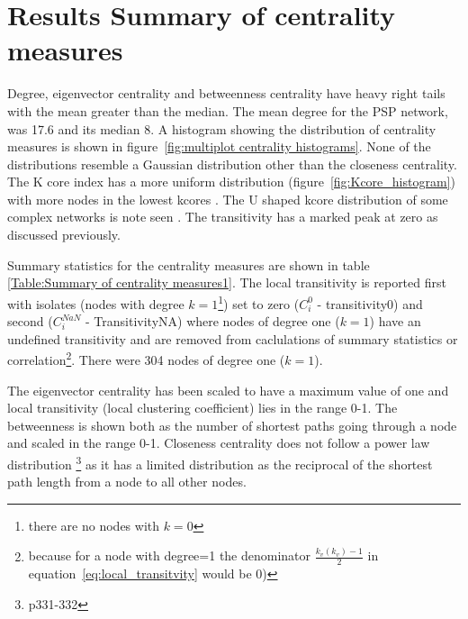 




\clearpage

\section{ Results Summary of centrality measures}
     Degree, eigenvector centrality and betweenness centrality have  heavy right tails with the mean greater than the median. The mean degree for the PSP network, was 17.6 and its median 8. A histogram showing the distribution of centrality measures is shown in figure~\ref{fig:multiplot centrality histograms}. None of the distributions resemble a Gaussian distribution other than the  closeness centrality. The K core index has a more uniform distribution (figure~\ref{fig:Kcore_histogram}) with more nodes in the lowest kcores \cite{dorogovtsev2006k}. The U shaped kcore distribution of some complex networks is note seen\cite{burleson2020k} 
 . The transitivity has a marked peak at zero as discussed previously. 
    
Summary statistics for the centrality measures are shown in table \ref{Table:Summary of centrality measures1}. The local transitivity is reported first with isolates (nodes with degree $k=1$\footnote{there are no nodes with $k=0$}) set to zero ($C_i^0$ - transitivity0) and second  ($C_{i}^{NaN}$ - TransitivityNA) where nodes of degree one ($k=1$) have an undefined transitivity and are removed from caclulations of summary statistics or correlation\footnote{because for a node with degree=1 the denominator $\frac{k_v(k_v)-1}{2}$ in equation~\ref{eq:local_transitvity}  would be 0)}.  There were 304 nodes of degree one ($k=1$). 


The eigenvector centrality has been scaled to have a maximum value of one and local transitivity (local clustering coefficient) lies in the range 0-1. The betweenness is shown both as the number of shortest paths going through a node and  scaled in the range 0-1.
    Closeness centrality does not follow a power law distribution \cite{newman2018networks}\footnote{p331-332} as it has a limited distribution as the reciprocal of the shortest path length from a node to all other nodes.   
    


